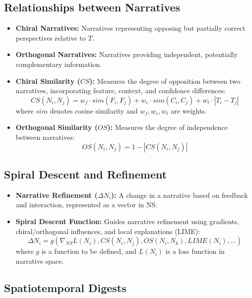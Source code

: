\documentclass[12pt, a4paper]{article}
\begin{document}
\subsection{Relationships between Narratives}

\begin{itemize}
    \item \textbf{Chiral Narratives:} Narratives representing opposing but partially correct perspectives relative to $T$.
    \item \textbf{Orthogonal Narratives:} Narratives providing independent, potentially complementary information.
    \item \textbf{Chiral Similarity ($CS$): } Measures the degree of opposition between two narratives, incorporating feature, context, and confidence differences:
    \[ CS(N_i, N_j) = w_f \cdot sim(F_i, F_j) + w_c \cdot sim(C_i, C_j) + w_t \cdot |T_i - T_j| \]
    where $sim$ denotes cosine similarity and $w_f, w_c, w_t$ are weights.
    \item \textbf{Orthogonal Similarity ($OS$): } Measures the degree of independence between narratives:
    \[ OS(N_i, N_j) = 1 - |CS(N_i, N_j)| \]
\end{itemize}

\subsection{Spiral Descent and Refinement}

\begin{itemize}
    \item \textbf{Narrative Refinement ($\Delta N_i$): } A change in a narrative based on feedback and interaction, represented as a vector in NS.
    \item \textbf{Spiral Descent Function:} Guides narrative refinement using gradients, chiral/orthogonal influences, and local explanations (LIME):
    \[ \Delta N_i = g(\nabla_{NS} L(N_i), CS(N_i, N_j), OS(N_i, N_k), LIME(N_i), \dots) \]
    where $g$ is a function to be defined, and $L(N_i)$ is a loss function in narrative space.
\end{itemize}

\subsection{Spatiotemporal Digests}
\end{document}
